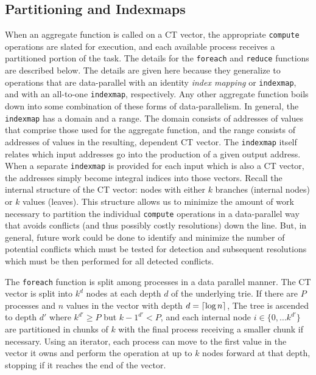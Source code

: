 \subsection{Partitioning and Indexmaps} \label{explain:indexmaps}
When an aggregate function is called on a CT vector, the appropriate
\texttt{compute} operations are slated for execution, and each available process
receives a partitioned portion of the task. The details for the \texttt{foreach}
and \texttt{reduce} functions are described below. The details are given here
because they generalize to operations that are data-parallel with an identity
\textit{index mapping} or \texttt{indexmap}, and with an all-to-one
\texttt{indexmap}, respectively. Any other aggregate function boils down into
some combination of these forms of data-parallelism. In general, the
\texttt{indexmap} has a domain and a range. The domain consists of addresses of
values that comprise those used for the aggregate function, and the range
consists of addresses of values in the resulting, dependent CT vector. The
\texttt{indexmap} itself relates which input addresses go into the production of
a given output address. When a separate \texttt{indexmap} is provided for each
input which is also a CT vector, the addresses simply become integral indices
into those vectors. Recall the internal structure of the CT vector: nodes with
either $k$ branches (internal nodes) or $k$ values (leaves). This structure
allows us to minimize the amount of work necessary to partition the individual
\texttt{compute} operations in a data-parallel way that avoids conflicts (and
thus possibly costly resolutions) down the line. But, in general, future work
could be done to identify and minimize the number of potential conflicts which
must be tested for detection and subsequent resolutions which must be then
performed for all detected conflicts.

The \texttt{foreach} function is split among processes in a data parallel
manner. The CT vector is split into $k^d$ nodes at each depth $d$  of the
underlying trie. If there are $P$ processes and $n$ values in the vector with
depth $d = \lceil\log{n}\rceil$, The tree is ascended to depth $d'$ where $k^{d'}
\geq P$ but ${k-1}^{d'} < P$, and each internal node $i \in \{0, \dots k^{d'}\}$
are partitioned in chunks of $k$ with the final process receiving a smaller
chunk if necessary. Using an iterator, each process can move to the first value
in the vector it owns and perform the operation at up to $k$ nodes forward at
that depth, stopping if it reaches the end of the vector.

